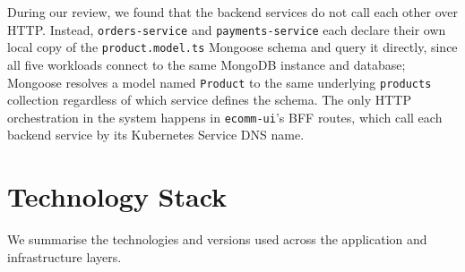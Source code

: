 \begin{infobox}
During our review, we found that the backend services do not call each other over
HTTP. Instead, \texttt{orders-service} and
\texttt{payments-service} each declare their own local copy of the
\texttt{product.model.ts} Mongoose schema and query it directly, since all five
workloads connect to the same MongoDB instance and database; Mongoose resolves a
model named \texttt{Product} to the same underlying \texttt{products} collection
regardless of which service defines the schema. The only HTTP orchestration in the
system happens in \texttt{ecomm-ui}'s BFF routes, which call each backend service by
its Kubernetes Service DNS name.
\end{infobox}

\newpage
\section{Technology Stack}\label{sec:tech-stack}
We summarise the technologies and versions used across the
application and infrastructure layers.

